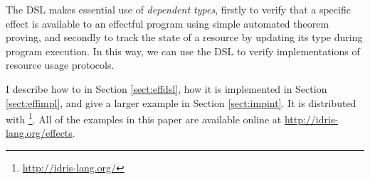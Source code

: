 \noindent
The \Eff{} DSL makes essential use of \emph{dependent types}, firstly to verify
that a specific effect is available to an effectful program using simple
automated theorem proving, and secondly to track the state of a resource by
updating its type during program execution. In this way, we can use the \Eff{}
DSL to verify implementations of resource usage protocols.

I describe how to  \Eff{} in Section \ref{sect:effdsl},
how it is implemented in Section \ref{sect:effimpl}, and give a larger example
in Section \ref{sect:impint}. It is distributed with
\Idris{}\footnote{\url{http://idris-lang.org/}}. All of the examples in this
paper are available online at \url{http://idris-lang.org/effects}.











